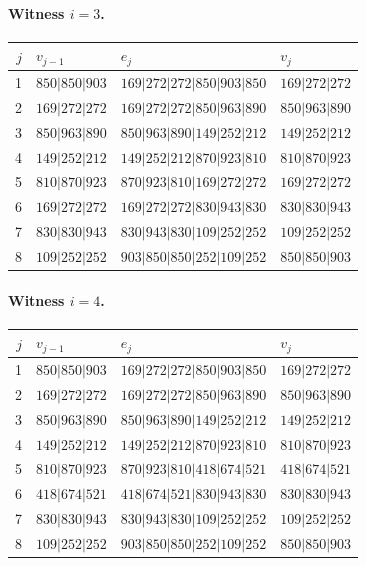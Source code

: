 \paragraph{Witness \(i=3\).}
\begin{center}
\small
\begin{tabular}{rlll}
\hline
\(j\)&\(v_{j-1}\)&\(e_j\)&\(v_j\)\\
\hline
1&\(850|850|903\)&\(169|272|272|850|903|850\)&\(169|272|272\)\\
2&\(169|272|272\)&\(169|272|272|850|963|890\)&\(850|963|890\)\\
3&\(850|963|890\)&\(850|963|890|149|252|212\)&\(149|252|212\)\\
4&\(149|252|212\)&\(149|252|212|870|923|810\)&\(810|870|923\)\\
5&\(810|870|923\)&\(870|923|810|169|272|272\)&\(169|272|272\)\\
6&\(169|272|272\)&\(169|272|272|830|943|830\)&\(830|830|943\)\\
7&\(830|830|943\)&\(830|943|830|109|252|252\)&\(109|252|252\)\\
8&\(109|252|252\)&\(903|850|850|252|109|252\)&\(850|850|903\)\\
\hline
\end{tabular}
\end{center}

\paragraph{Witness \(i=4\).}
\begin{center}
\small
\begin{tabular}{rlll}
\hline
\(j\)&\(v_{j-1}\)&\(e_j\)&\(v_j\)\\
\hline
1&\(850|850|903\)&\(169|272|272|850|903|850\)&\(169|272|272\)\\
2&\(169|272|272\)&\(169|272|272|850|963|890\)&\(850|963|890\)\\
3&\(850|963|890\)&\(850|963|890|149|252|212\)&\(149|252|212\)\\
4&\(149|252|212\)&\(149|252|212|870|923|810\)&\(810|870|923\)\\
5&\(810|870|923\)&\(870|923|810|418|674|521\)&\(418|674|521\)\\
6&\(418|674|521\)&\(418|674|521|830|943|830\)&\(830|830|943\)\\
7&\(830|830|943\)&\(830|943|830|109|252|252\)&\(109|252|252\)\\
8&\(109|252|252\)&\(903|850|850|252|109|252\)&\(850|850|903\)\\
\hline
\end{tabular}
\end{center}

